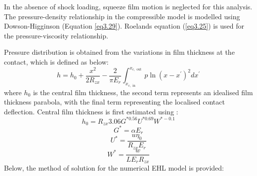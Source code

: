 In the absence of shock loading, squeeze film motion is neglected for this analysis. The pressure-density relationship in the compressible model is modelled using Dowson-Higginson \cite{Dowson1977} (Equation \ref{eq3.29}). Roelands equation \cite{Roelands1966} (\ref{eq3.25}) is used for the pressure-viscosity relationship.

Pressure distribution is obtained from the variations in film thickness at the contact, which is defined as below:
\begin{equation}\label{eq3.34}
	h=h_0+\frac{x^2}{2 R_{z x}}-\frac{2}{\pi E_r} \int_{x_{c, \text { in }}}^{x_{c, \text { out }}} p \ln \left(x-x^{\prime}\right)^2 d x^{\prime}
\end{equation}
where $h_0$ is the central film thickness, the second term represents an idealised film thickness parabola, with the final term representing the localised contact deflection. Central film thickness is first estimated using \cite{Dowson1979}:
\begin{equation}\label{eq3.35}
	h_0=R_{z x} 3.06 G^{* 0.56} U^{* 0.69} W^{*-0.1}
\end{equation}
\begin{equation}\label{eq3.36}
	G^*=\alpha E_r 
\end{equation}
\begin{equation}\label{eq3.37}
	U^*=\frac{u \eta_0}{R_{z x} E_r}
\end{equation}
\begin{equation}\label{eq3.38}
	W^*=\frac{w}{L E_r R_{z x}}
\end{equation}
Below, the method of solution for the numerical EHL model is provided:

